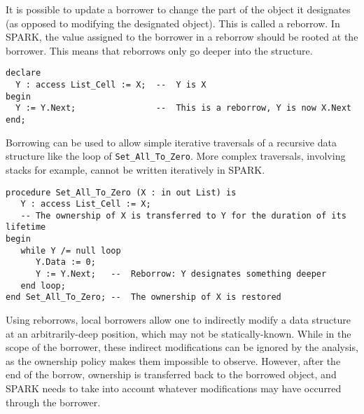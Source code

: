 \documentclass[runningheads]{llncs}
\begin{document}
It is possible to update a borrower to change the part of the object it designates (as opposed to modifying the designated object). This is called a reborrow. In SPARK, the value assigned to the borrower in a reborrow should be rooted at the borrower. This means that reborrows only go deeper into the structure.
\begin{lstlisting}
declare
  Y : access List_Cell := X;  --  Y is X
begin
  Y := Y.Next;                --  This is a reborrow, Y is now X.Next
end;
\end{lstlisting}
Borrowing can be used to allow simple iterative traversals of a recursive data structure like the loop of \texttt{Set\_All\_To\_Zero}. More complex traversals, involving stacks for example, cannot be written iteratively in SPARK.
\begin{lstlisting}
procedure Set_All_To_Zero (X : in out List) is
   Y : access List_Cell := X;
   -- The ownership of X is transferred to Y for the duration of its lifetime
begin
   while Y /= null loop
      Y.Data := 0;
      Y := Y.Next;   --  Reborrow: Y designates something deeper
   end loop;
end Set_All_To_Zero; --  The ownership of X is restored
\end{lstlisting}
Using reborrows, local borrowers allow one to indirectly modify a data structure at an arbitrarily-deep position, which may not be statically-known. While in the scope of the borrower, these indirect modifications can be ignored by the analysis, as the ownership policy makes them impossible to observe. However, after the end of the borrow, ownership is transferred back to the borrowed object, and SPARK needs to take into account whatever modifications may have occurred through the borrower.
\end{document}
